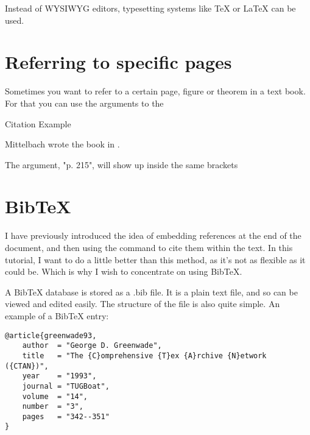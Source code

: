 \begin{refsection}
Instead of WYSIWYG editors, typesetting systems like TeX or LaTeX \parencite{lamport2004} can be used.\cite{Abut1990}

\section{Referring to specific pages}

Sometimes you want to refer to a certain page, figure or theorem in a text book. For that you can use the arguments to the 


\begin{texexample}{Citation Example}{}
\cite{Mittelbach2004}



\parencite[p. 215][]{Mittelbach2004}



\textcite{Mittelbach2004}

Mittelbach wrote the book\autocite{Mittelbach2004} in \citeyear{Mittelbach2004}.
\end{texexample}

The argument, "p. 215", will show up inside the same brackets



\section{BibTeX}

I have previously introduced the idea of embedding references at the end of the document, and then using the  command to cite them within the text. In this tutorial, I want to do a little better than this method, as it's not as flexible as it could be. Which is why I wish to concentrate on using BibTeX.

A BibTeX database is stored as a .bib file. It is a plain text file, and so can be viewed and edited easily. The structure of the file is also quite simple. An example of a BibTeX entry:

\begin{verbatim}
@article{greenwade93,
    author  = "George D. Greenwade",
    title   = "The {C}omprehensive {T}ex {A}rchive {N}etwork ({CTAN})",
    year    = "1993",
    journal = "TUGBoat",
    volume  = "14",
    number  = "3",
    pages   = "342--351"
}
\end{verbatim}


\end{refsection}
